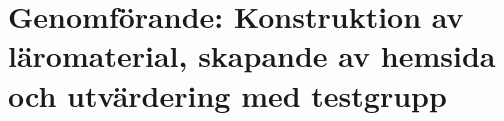 



\chapter{Genomförande: Konstruktion av läromaterial, skapande av hemsida och utvärdering med testgrupp}

